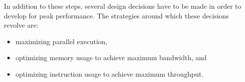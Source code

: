 In addition to these steps,
several design decisions have to be made
in order to develop for peak performance.
The strategies around which these decisions revolve are:
\begin{itemize}
  \item maximizing parallel execution,
  \item optimizing memory usage to achieve maximum bandwidth, and
  \item optimizing instruction usage to achieve maximum throughput.
\end{itemize}

